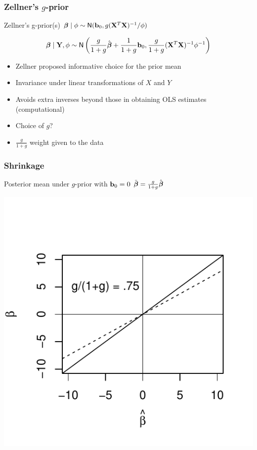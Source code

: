 \documentclass[handout]{beamer}\usepackage[]{graphicx}\usepackage[]{color}
\makeatletter
\def\maxwidth{ %
  \ifdim\Gin@nat@width>\linewidth
    \linewidth
  \else
    \Gin@nat@width
  \fi
}
\newenvironment{knitrout}{}{} %
\makeatother
\begin{document}
\begin{frame}
  \frametitle{Zellner's $g$-prior}
Zellner's g-prior(s) $\boldsymbol{\beta} \mid \phi \sim \textsf{N}(\mathbf{b}_0, g
    (\mathbf{X}^T\mathbf{X})^{-1}/\phi)$ \pause

$$\boldsymbol{\beta} \mid \mathbf{Y}, \phi \sim \textsf{N}\left( \frac{g}{1 + g} \hat{\boldsymbol{\beta}} +  \frac{1}{1 + g}
\mathbf{b}_0, \frac{g}{1 + g} (\mathbf{X}^T\mathbf{X})^{-1} \phi^{-1} \right)$$ \pause

\begin{itemize}
\item Zellner proposed informative choice for the prior mean
\item Invariance under linear transformations of $X$ and $Y$
\item Avoids extra inverses beyond those in obtaining OLS estimates (computational)
\item Choice of $g$?  \pause
\item $\frac{g}{1 + g}$  weight given to the data \pause
\end{itemize}



\end{frame}

\begin{frame}[fragile]  \frametitle{Shrinkage}
 Posterior mean under  $g$-prior  with $\mathbf{b}_0 = 0$
$\tilde{\boldsymbol{\beta}} = \frac{g}{1 +g} \hat{\boldsymbol{\beta}} $

\vspace{-24pt}
\begin{knitrout}
\color{fgcolor}
\includegraphics[width=\maxwidth]{figure/unnamed-chunk-1-1} 

\end{knitrout}




\end{frame}
\end{document}
